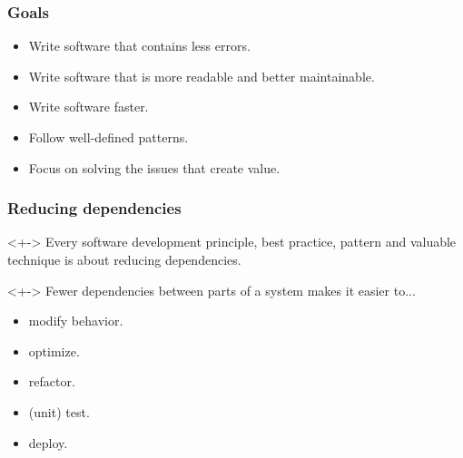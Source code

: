 \begin{frame}
	\frametitle{Goals}
	\begin{itemize}[<+-| highlight@+>]
		\item Write software that contains less errors.
		\item Write software that is more readable and better maintainable.
		\item Write software faster.
		\item Follow well-defined patterns.
		\item Focus on solving the issues that create value.
	\end{itemize}
\end{frame}


\begin{frame}
	\frametitle{Reducing dependencies}
	\begin{block}{}<+->
		Every software development principle, best practice, pattern and valuable technique is about \alert{reducing dependencies}.
	\end{block}

	\begin{block}{}<+->
		Fewer dependencies between parts of a system makes it easier to...
		\begin{itemize}[<+-| highlight@+>]
			\item modify behavior.
			\item optimize.
			\item refactor.
			\item (unit) test.
			\item deploy.
		\end{itemize}
	\end{block}
\end{frame}

